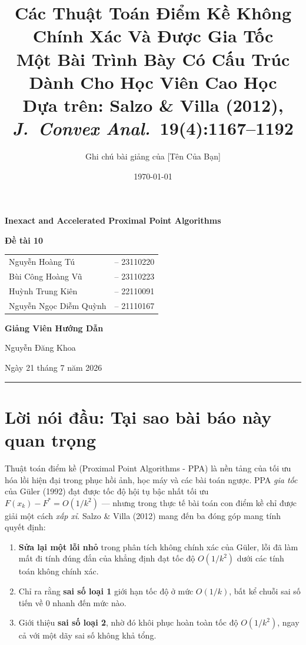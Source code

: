 \documentclass[12pt, a4paper]{article}
\title{%
  \textcolor{deepblue}{\LARGE\bfseries
    Các Thuật Toán Điểm Kề Không Chính Xác Và Được Gia Tốc}\\[6pt]
  \large Một Bài Trình Bày Có Cấu Trúc Dành Cho Học Viên Cao Học\\[4pt]
  \normalsize
  Dựa trên: Salzo \& Villa (2012),
  \textit{J.\ Convex Anal.}\ \textbf{19}(4):1167--1192
}
\author{Ghi chú bài giảng của [Tên Của Bạn]}
\date{\today}
\begin{document}
\begin{titlepage}
\centering
\vspace*{2cm}
{\huge\bfseries Inexact and Accelerated
Proximal Point Algorithms\par}
\vspace{2cm}
{\Large\bfseries Đề tài 10\par}
\vspace{0.5cm}
\begin{tabular}{ll}
Nguyễn Hoàng Tú & -- 23110220 \\
Bùi Công Hoàng Vũ & -- 23110223 \\
Huỳnh Trung Kiên & -- 22110091 \\
Nguyễn Ngọc Diễm Quỳnh & -- 21110167 \\
\end{tabular}\par
\vspace{2cm}
{\large\bfseries Giảng Viên Hướng Dẫn\par}
\vspace{0.2cm}
{\large Nguyễn Đăng Khoa\par}
\vfill
{\large Ngày 21 tháng 7 năm 2026\par}
\end{titlepage}

\maketitle\thispagestyle{empty}
\tableofcontents
\bigskip\hrule\bigskip

\section*{Lời nói đầu: Tại sao bài báo này quan trọng}

Thuật toán điểm kề (Proximal Point Algorithms - PPA) là nền tảng của tối ưu hóa lồi hiện đại trong phục hồi ảnh, học máy và các bài toán ngược.
PPA \emph{gia tốc} của G\"{u}ler (1992) đạt được tốc độ hội tụ bậc nhất tối ưu
$F(x_k)-F^*=O(1/k^2)$ --- nhưng trong thực tế bài toán con điểm kề chỉ được giải một cách \emph{xấp xỉ}.
Salzo \& Villa (2012) mang đến ba đóng góp mang tính quyết định:

\begin{enumerate}[label=\textbf{C\arabic*.}, leftmargin=2.5em]
  \item \textbf{Sửa lại một lỗi nhỏ} trong phân tích không chính xác của G\"{u}ler, lỗi đã làm mất đi tính đúng đắn của khẳng định đạt tốc độ $O(1/k^2)$ dưới các tính toán không chính xác.
  \item Chỉ ra rằng \textbf{sai số loại 1} giới hạn tốc độ ở mức $O(1/k)$,
        bất kể chuỗi sai số tiến về $0$ nhanh đến mức nào.
  \item Giới thiệu \textbf{sai số loại 2}, nhờ đó khôi phục hoàn toàn tốc độ
        $O(1/k^2)$, ngay cả với một dãy sai số không khả tổng.
\end{enumerate}
\end{document}

